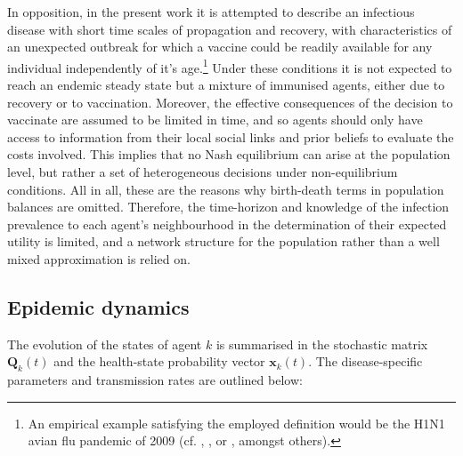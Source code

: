 \documentclass[11pt]{article}
\begin{document}
In opposition, in the present work it is attempted to describe an infectious disease with short time scales of propagation and recovery, with characteristics of an unexpected outbreak for which a vaccine could be readily available for any individual independently of it's age.\footnote{An empirical example satisfying the employed definition would be the H1N1 avian flu pandemic of 2009 (cf. \cite{hancock2009}, \cite{neumann2009}, or \cite{smith2009}, amongst others).} Under these conditions it is not expected to reach an endemic steady state but a mixture of immunised agents, either due to recovery or to vaccination. Moreover, the effective consequences of the decision to vaccinate are assumed to be limited in time, and so agents should only have access to information from their local social links and prior beliefs to evaluate the costs involved. This implies that no Nash equilibrium can arise at the population level, but rather a set of heterogeneous decisions under non-equilibrium conditions. All in all, these are the reasons why birth-death terms in population balances are omitted. Therefore, the time-horizon and knowledge of the infection prevalence to each agent's neighbourhood in the determination of their expected utility is limited, and  a network structure for the population rather than a well mixed approximation is relied on. 

\subsection{Epidemic dynamics}

The evolution of the states of agent \(k\) is summarised in the stochastic matrix \(\mathbf{Q}_k(t)\) and the health-state probability vector \(\mathbf{x}_k(t)\). The disease-specific parameters and transmission rates are outlined below:
\end{document}

